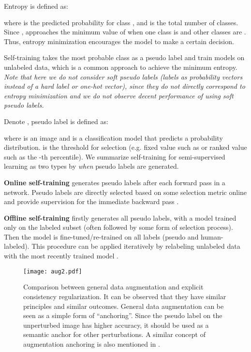 \documentclass[preprint,review,10pt]{elsarticle}
\begin{document}
Entropy  is defined as:

where  is the predicted probability for class , and  is the total number of classes. Since ,  approaches the minimum value of  when one class is  and other classes are . Thus, entropy minimization encourages the model to make a certain decision.

Self-training takes the most probable class as a pseudo label and train models on unlabeled data, which is a common approach to achieve the minimum entropy. \textit{Note that here we do not consider soft pseudo labels (labels as probability vectors instead of a hard label or one-hot vector), since they do not directly correspond to entropy minimization and we do not observe decent performance of using soft pseudo labels. } 

Denote , pseudo label  is defined as:

where  is an image and  is a classification model that predicts a probability distribution.  is the threshold for selection (e.g. fixed value such as  or ranked value such as the -th percentile). We summarize self-training for semi-supervised learning as two types by \textit{when} pseudo labels are generated.

\textbf{Online self-training} generates pseudo labels after each forward pass in a network. Pseudo labels are directly selected based on some selection metric online and provide supervision for the immediate backward pass \cite{lee2013pseudo}.

\textbf{Offline self-training} firstly generates all pseudo labels, with a model trained only on the labeled subset (often followed by some form of selection process). Then the model is fine-tuned/re-trained on all labels (pseudo and human-labeled). This procedure can be applied iteratively by relabeling unlabeled data with the most recently trained model \cite{cbst}.

\begin{figure}[t]
\centering
\texttt{[image: aug2.pdf]}
\caption{Comparison between general data augmentation and explicit consistency regularization. It can be observed that they have similar principles and similar outcomes. General data augmentation can be seen as a simple form of ``anchoring''. Since the pseudo label on the unperturbed image has higher accuracy, it should be used as a semantic anchor for other perturbations. A similar concept of augmentation anchoring is also mentioned in \cite{berthelot2020remixmatch}. }
\label{fig8}
\end{figure}
\end{document}
